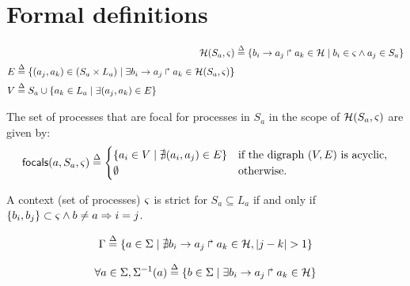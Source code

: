 \appendix

\newpage

\section{Formal definitions}



\begin{align}
\mathcal{H}(S_a,\varsigma) & \stackrel{\Delta}= \{ b_i\rightarrow a_j\Rsh a_k\in\mathcal{H} \mid b_i\in\varsigma \wedge a_j\in S_a \}
\label{eq:PHa-ctx}
\\
\begin{split}
E  & \stackrel{\Delta}= \{(a_j,a_k)\in (S_a \times L_a) \mid
                        \exists b_i\rightarrow a_j\Rsh a_k\in \mathcal{H}(S_a,\varsigma) \}
\\
V & \stackrel{\Delta}= S_a \cup \{ a_k\in L_a\mid \exists (a_j,a_k)\in E\}
\end{split}
\label{eq:bounce-graph}
\end{align}

\begin{definition}\label{def:focals}
The set of processes that are focal for processes in $S_a$ in the scope of $\mathcal{H}(S_a,\varsigma)$
are given by:
\[
\mathsf{focals}(a,S_a,\varsigma) \stackrel{\Delta}=
\begin{cases}
\{ a_i \in V \mid \nexists (a_i,a_j)\in E\} & \text{if the digraph $(V,E)$ is acyclic},\\
\emptyset & \text{otherwise.}\\
\end{cases}
\]
\end{definition}

\begin{definition}\label{def:strict-ctx}
A context (set of processes) $\varsigma$ is strict for $S_a\subseteq L_a$ if and only if
$\{b_i,b_j\} \subset \varsigma \wedge b\neq a \Rightarrow i=j$.
\end{definition}

\begin{equation}
\Gamma \stackrel{\Delta}= \{a \in \Sigma \mid \nexists b_i\rightarrow a_j\Rsh a_k \in \mathcal{H}, |j - k| > 1\} \\
\label{eq:PH-components}
\end{equation}

\begin{equation}
\forall a \in \Sigma, \Sigma^{-1}(a) \stackrel{\Delta}= \{b \in \Sigma \mid \exists b_i\rightarrow a_j\Rsh a_k\in\mathcal{H} \}
\label{eq:ph_direct_predec}
\end{equation}

